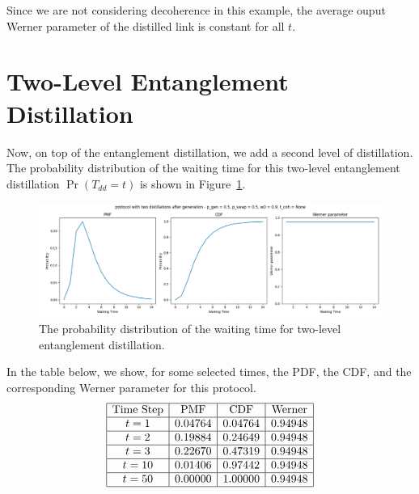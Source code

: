 \documentclass{masterthesis}
\begin{document}
Since we are not considering decoherence in this example, the average ouput Werner parameter of the distilled link is constant for all $t$.

\section{Two-Level Entanglement Distillation}

Now, on top of the entanglement distillation, we add a second level of distillation. The probability distribution of the waiting time for this two-level entanglement distillation $\Pr(T_{dd} = t)$ is shown in Figure~\ref{fig:two_level_distillation_waiting_time}.

\begin{figure}[ht]
    \centering
    \includegraphics[width=1\linewidth]{images/dist_tests/two distillations after generation.png}
    \caption{The probability distribution of the waiting time for two-level entanglement distillation.}
    \label{fig:two_level_distillation_waiting_time}
\end{figure}

In the table below, we show, for some selected times, the PDF, the CDF, and the corresponding Werner parameter for this protocol.
\begin{equation*}
    \begin{array}{|c|c|c|c|}
        \hline
        \text{Time Step} & \text{PMF} & \text{CDF} & \text{Werner} \\
        \hline
        t = 1 & 0.04764 & 0.04764 & 0.94948 \\
        \hline
        t = 2 & 0.19884 & 0.24649 & 0.94948 \\
        \hline
        t = 3 & 0.22670 & 0.47319 & 0.94948 \\
        \hline
        t = 10 & 0.01406 & 0.97442 & 0.94948 \\
        \hline
        t = 50 & 0.00000 & 1.00000 & 0.94948 \\
        \hline
    \end{array}
\end{equation*}
\end{document}
